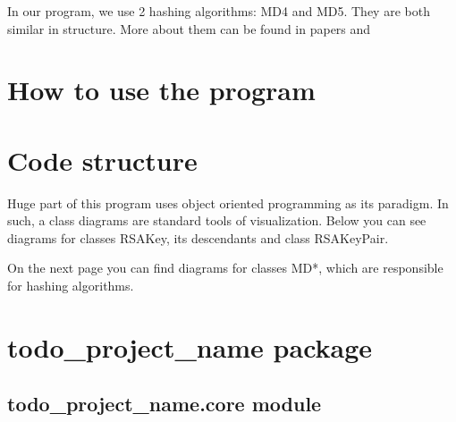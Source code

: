\documentclass[letterpaper,10pt,english]{sphinxmanual}
\begin{document}
In our program, we use 2 hashing algorithms: MD4 and MD5. They are both
similar in structure. More about them can be found in papers \cite{md4}
and \cite{md5}

\printbibliography


\chapter{How to use the program}
\chapter{Code structure}

\vspace{1em}
Huge part of this program uses object oriented programming
as its paradigm. In such, a class diagrams are standard tools
of visualization. Below you can see diagrams for classes
RSAKey, its descendants and class RSAKeyPair.

On the next page you can find diagrams for classes MD*, which
are responsible for hashing algorithms.
\vspace{3em}





\chapter{todo\_project\_name package}
\label{\detokenize{modules:todo-project-name}}\label{\detokenize{modules::doc}}
\sphinxstepscope


\section{todo\_project\_name.core module}
\label{\detokenize{todo_project_name:module-todo_project_name.core}}\label{\detokenize{todo_project_name:todo-project-name-core-module}}
\end{document}
